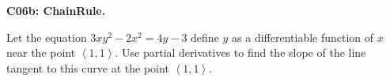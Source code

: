 \documentclass[12pt]{article}
\newcommand{\<}{\left\langle}
\renewcommand{\>}{\right\rangle}
\newcommand{\exerciseHeader}[4]{


  \vspace{0.5em}
  \textbf{#2}
  \vspace{0.5em}

}
\begin{document}
\begin{multicols}{2}
%

\columnbreak
\exerciseHeader{2017 June 23}{C06b: ChainRule.}{
Apply the multivariable Chain Rule to compute derivatives and find normal
vectors.
}{3/4}

Let the equation \(3xy^2-2x^2=4y-3\) define \(y\) as a differentiable
function of \(x\) near the point \(\<1,1\>\). Use partial derivatives
to find the slope of the line tangent to this curve at the point \(\<1,1\>\).


%



%

%

%



%

%


\end{multicols}
\end{document}
